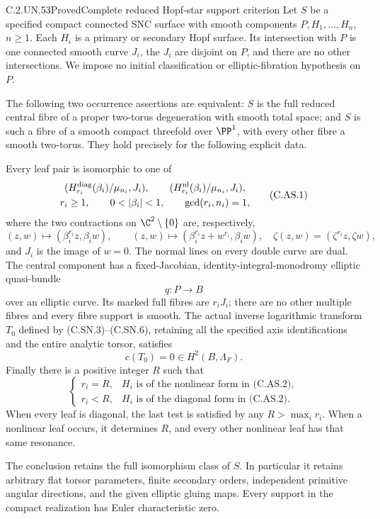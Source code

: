 \begin{statement}{C.2.UN.53}{Proved}{Complete reduced Hopf-star support criterion}
Let $S$ be a specified compact connected SNC surface with smooth
components $P,H_1,\ldots,H_n$, $n\ge1$. Each $H_i$ is a primary
or secondary Hopf surface. Its intersection with $P$ is one
connected smooth curve $J_i$, the $J_i$ are disjoint on $P$,
and there are no other intersections. We impose no initial
classification or elliptic-fibration hypothesis on $P$.

The following two occurrence assertions are equivalent: $S$
is the full reduced central fibre of a proper two-torus
degeneration with smooth total space; and $S$ is such a fibre
of a smooth compact threefold over $\PP^1$, with every other
fibre a smooth two-torus. They hold precisely for the following
explicit data.

Every leaf pair is isomorphic to one of
\[
 \begin{gathered}
 (H^{\rm diag}_{r_i}(\beta_i)/\mu_{n_i},J_i),\qquad
 (H^{\rm nl}_{r_i}(\beta_i)/\mu_{n_i},J_i),\\
 r_i\ge1,\qquad 0<|\beta_i|<1,\qquad \gcd(r_i,n_i)=1 ,
 \end{gathered}                                             \tag{C.AS.1}
\]
where the two contractions on $\C^2\setminus\{0\}$ are,
respectively,
\[
 (z,w)\longmapsto(\beta_i^{r_i}z,\beta_iw),\qquad
 (z,w)\longmapsto(\beta_i^{r_i}z+w^{r_i},\beta_iw),
 \quad
 \zeta(z,w)=(\zeta^{r_i}z,\zeta w),                         \tag{C.AS.2}
\]
and $J_i$ is the image of $w=0$. The normal lines on every
double curve are dual. The central component has a
fixed-Jacobian, identity-integral-monodromy elliptic
quasi-bundle
\[
                         q:P\longrightarrow B             \tag{C.AS.3}
\]
over an elliptic curve. Its marked full fibres are $r_iJ_i$;
there are no other multiple fibres and every fibre support
is smooth. The actual inverse logarithmic transform $T_0$
defined by (C.SN.3)--(C.SN.6), retaining all the specified
axis identifications and the entire analytic torsor,
satisfies
\[
                         c(T_0)=0\in H^2(B,\Lambda_F).     \tag{C.AS.4}
\]
Finally there is a positive integer $R$ such that
\[
 \begin{cases}
 r_i=R,&H_i\text{ is of the nonlinear form in (C.AS.2)},\\
 r_i<R,&H_i\text{ is of the diagonal form in (C.AS.2)}.
 \end{cases}                                             \tag{C.AS.5}
\]
When every leaf is diagonal, the last test is satisfied by
any $R>\max_i r_i$. When a nonlinear leaf occurs, it
determines $R$, and every other nonlinear leaf has that
same resonance.

The conclusion retains the full isomorphism class of $S$.
In particular it retains arbitrary flat torsor parameters,
finite secondary orders, independent primitive angular
directions, and the given elliptic gluing maps. Every support
in the compact realization has Euler characteristic zero.
\end{statement}


